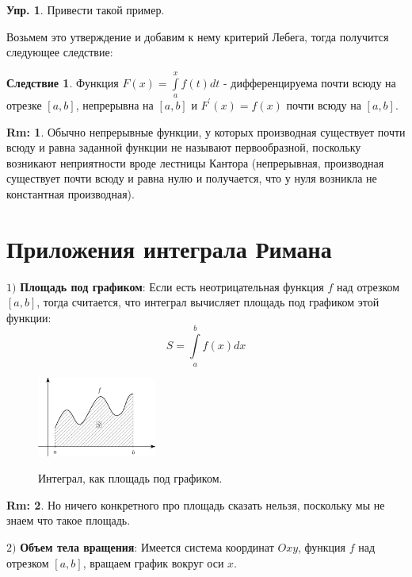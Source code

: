 \documentclass[12pt]{article}
\theoremstyle{definition}
\newtheorem{rem}{Rm:}
\newtheorem{exrc}{Упр.}
\newtheorem{corollary}{Следствие}
\newcommand{\ddint}[2]{\displaystyle\int\limits_{#1}^{#2}}
\begin{document}
\begin{exrc}
	Привести такой пример.
\end{exrc}
Возьмем это утверждение и добавим к нему критерий Лебега, тогда получится следующее следствие:
\begin{corollary}
	Функция $F(x) = \ddint{a}{x}f(t)dt$ - дифференцируема почти всюду на отрезке $[a,b]$, непрерывна на $[a,b]$ и $F^\prime(x) = f(x)$ почти всюду на $[a,b]$.
\end{corollary}
\begin{rem}
	Обычно непрерывные функции, у которых производная существует почти всюду и равна заданной функции не называют первообразной, поскольку возникают неприятности вроде лестницы Кантора (непрерывная, производная существует почти всюду и равна нулю и получается, что у нуля возникла не константная производная).
\end{rem}
\newpage

\section*{Приложения интеграла Римана}
$1)$ \textbf{Площадь под графиком}: Если есть неотрицательная функция $f$ над отрезком $[a,b]$, тогда считается, что интеграл вычисляет площадь под графиком этой функции:
$$
	S = \ddint{a}{b}f(x)dx
$$
\begin{figure}[H]
	\centering
	\includegraphics[width=0.35\textwidth]{26_1.png}
	\label{26_1}
	\caption{Интеграл, как площадь под графиком.}
	\label{fig:Площадь под графиком}
\end{figure}
\begin{rem}
	Но ничего конкретного про площадь сказать нельзя, поскольку мы не знаем что такое площадь.
\end{rem}

$2)$ \textbf{Объем тела вращения}: Имеется система координат $Oxy$, функция $f$ над отрезком $[a,b]$, вращаем график вокруг оси $x$.
\end{document}
